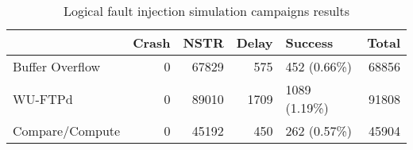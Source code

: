 \begin{table}[t]
\centering
\caption{Logical fault injection simulation campaigns results}
\label{table:end_sim_by_status_hamming_single_bitflip_spatial}
\begin{tabular}{lrrrlr}
\toprule
 & Crash & NSTR & Delay & Success & Total \\
\midrule
Buffer Overflow & 0 & 67829 & 575 & 452 (0.66\%) & 68856 \\
WU-FTPd & 0 & 89010 & 1709 & 1089 (1.19\%) & 91808 \\
Compare/Compute & 0 & 45192 & 450 & 262 (0.57\%) & 45904 \\
\bottomrule
\end{tabular}
\end{table}
